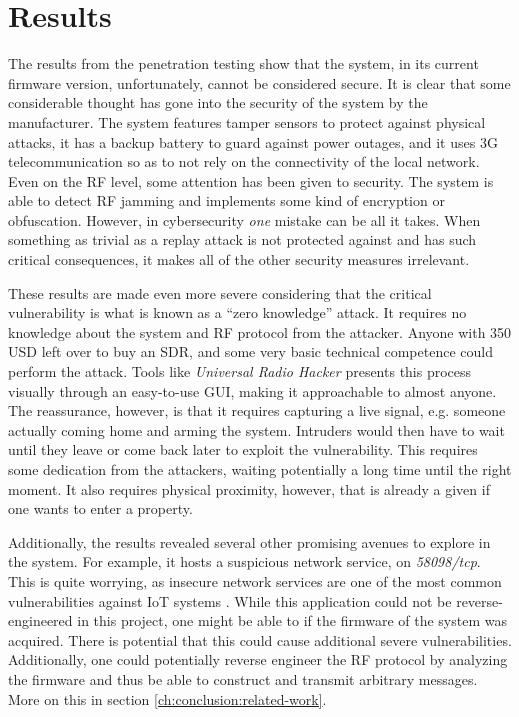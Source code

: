 \section{Results}
The results from the penetration testing show that the system, in its current firmware version, unfortunately, cannot be considered secure. It is clear that some considerable thought has gone into the security of the system by the manufacturer. The system features tamper sensors to protect against physical attacks, it has a backup battery to guard against power outages, and it uses 3G telecommunication so as to not rely on the connectivity of the local network. Even on the RF level, some attention has been given to security. The system is able to detect RF jamming and implements some kind of encryption or obfuscation. However, in cybersecurity \textit{one} mistake can be all it takes. When something as trivial as a replay attack is not protected against and has such critical consequences, it makes all of the other security measures irrelevant.

These results are made even more severe considering that the critical vulnerability is what is known as a \enquote{zero knowledge} attack. It requires no knowledge about the system and RF protocol from the attacker. Anyone with 350 USD left over to buy an SDR, and some very basic technical competence could perform the attack. Tools like \textit{Universal Radio Hacker} \cite{urh} presents this process visually through an easy-to-use GUI, making it approachable to almost anyone. The reassurance, however, is that it requires capturing a live signal, e.g. someone actually coming home and arming the system. Intruders would then have to wait until they leave or come back later to exploit the vulnerability. This requires some dedication from the attackers, waiting potentially a long time until the right moment. It also requires physical proximity, however, that is already a given if one wants to enter a property.

Additionally, the results revealed several other promising avenues to explore in the system. For example, it hosts a suspicious network service, on \textit{58098/tcp}. This is quite worrying, as insecure network services are one of the most common vulnerabilities against IoT systems \cite{owasp-iot-top10, etsi-iot-standard}. While this application could not be reverse-engineered in this project, one might be able to if the firmware of the system was acquired. There is potential that this could cause additional severe vulnerabilities. Additionally, one could potentially reverse engineer the RF protocol by analyzing the firmware and thus be able to construct and transmit arbitrary messages. More on this in section \ref{ch:conclusion:related-work}.

